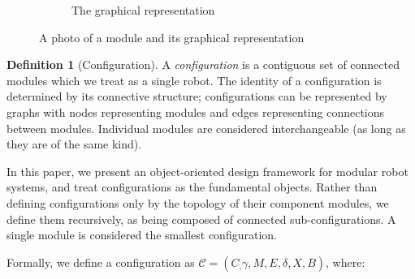 \documentclass[conference]{IEEEtran}
\theoremstyle{definition}
\newtheorem{definition}{Definition}[section]
\begin{document}
\begin{figure}
\begin{center}
\begin{subfigure}[b]{0.4\columnwidth}
                \caption{The graphical representation}
                \label{fig:smores_graph}
        \end{subfigure}
\end{center}
\caption{A photo of a module and its graphical representation}
\label{fig:smores}
\end{figure}


\begin{definition}[Configuration]
\label{def:configuration}
A \textit{configuration} is a contiguous set of connected modules which we treat as a
single robot.  The identity of a configuration is determined by its connective structure; configurations
can be represented by graphs with nodes representing modules and edges
representing connections between modules.   Individual modules
are considered interchangeable (as long as they are of the same kind).

In this paper, we present an object-oriented design framework for modular robot
systems, and treat configurations as the fundamental objects. Rather than defining
configurations only by the topology of their component modules, we define them recursively,
as being composed of connected sub-configurations. A single module is considered the
smallest configuration.

Formally, we define a configuration as $\mathcal{C}=(C_, \gamma, M, E, \delta,
X, B)$, where:
\begin{itemize}


\end{itemize}
\end{definition}
\end{document}
